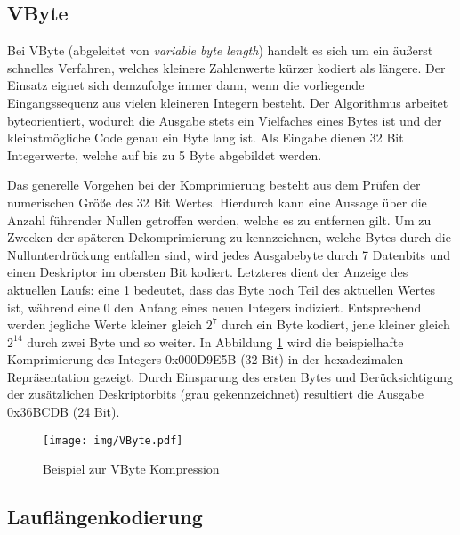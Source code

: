 \subsection{VByte}

Bei VByte \cite{Croft2009} (abgeleitet von \textit{variable byte length}) handelt es sich um ein äußerst schnelles Verfahren, welches kleinere Zahlenwerte kürzer kodiert als längere. Der Einsatz eignet sich demzufolge immer dann, wenn die vorliegende Eingangssequenz aus vielen kleineren Integern besteht. Der Algorithmus arbeitet byteorientiert, wodurch die Ausgabe stets ein Vielfaches eines Bytes ist und der kleinstmögliche Code genau ein Byte lang ist. Als Eingabe dienen 32 Bit Integerwerte, welche auf bis zu 5 Byte abgebildet werden.

Das generelle Vorgehen bei der Komprimierung besteht aus dem Prüfen der numerischen Größe des 32 Bit Wertes. Hierdurch kann eine Aussage über die Anzahl führender Nullen getroffen werden, welche es zu entfernen gilt. Um zu Zwecken der späteren Dekomprimierung zu kennzeichnen, welche Bytes durch die Nullunterdrückung entfallen sind, wird jedes Ausgabebyte durch 7 Datenbits und einen Deskriptor im obersten Bit kodiert. Letzteres dient der Anzeige des aktuellen Laufs: eine 1 bedeutet, dass das Byte noch Teil des aktuellen Wertes ist, während eine 0 den Anfang eines neuen Integers indiziert. Entsprechend werden jegliche Werte kleiner gleich $2^7$ durch ein Byte kodiert, jene kleiner gleich $2^{14}$ durch zwei Byte und so weiter. In Abbildung \ref{fig:vbyte} wird die beispielhafte Komprimierung des Integers 0x000D9E5B (32 Bit) in der hexadezimalen Repräsentation gezeigt. Durch Einsparung des ersten Bytes und Berücksichtigung der zusätzlichen Deskriptorbits (grau gekennzeichnet) resultiert die Ausgabe 0x36BCDB (24 Bit).

\begin{figure}
	\texttt{[image: img/VByte.pdf]}
	\centering
	\caption{Beispiel zur VByte Kompression}
	\label{fig:vbyte}
\end{figure}

\subsection{Lauflängenkodierung}

